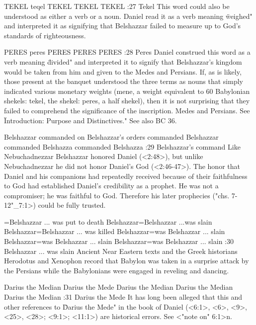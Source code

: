     {TEKEL} %
    {teqel} %
    {TEKEL} %
    {TEKEL} %
    {TEKEL} %
:27 {Tekel} %
This word could also be understood as either a verb or a noun. Daniel
read it as a verb meaning  
 \"weighed" and interpreted it as signifying that Belshazzar failed to 
measure up to God's standards of righteousness.

    {PERES} %
    {peres} %
    {PERES} %
    {PERES} %
    {PERES} %
:28 {Peres} %
Daniel construed this word as a 
verb meaning \"divided" and interpreted it to signify that Belshazzar's kingdom would be taken from
him and given to the Medes  
and Persians. If, as is likely, those present at the banquet understood the three terms as nouns
that simply indicated various monetary weights (mene, a weight equivalent to 60 Babylonian shekels: 
tekel, the shekel: peres, a half shekel), then it is not surprising that 
they failed to comprehend the significance of the inscription. 
Medes and Persians. See \"Introduction: Purpose and Distinctives." See also BC 36.

    {Belshazzar commanded} %
    {on Belshazzar's orders} %
    {commanded Belshazzar} %
    {commanded Belshazza} %
    {commanded Belshazza} %
:29 {Belshazzar's command} Like Nebuchadnezzar Belshazzar 
honored Daniel (<2:48>), but unlike Nebuchadnezzar he did not honor Daniel's God (<2:46-47>). The honor
that Daniel and his companions had repeatedly received because of their faithfulness to God 
had established Daniel's credibility as a prophet. He was not a 
compromiser; he was faithful to God. Therefore his later prophecies ("chs. 7-12"_7:1>) could be fully
trusted. 

={Belshazzar ... was put to death}  %
    {Belshazzar}={Belshazzar ...was slain}  %
    {Belshazzar}={Belshazzar ... was killed}  %
    {Belshazzar}={was Belshazzar ... slain}  %
    {Belshazzar}={was Belshazzar ... slain}  %
    {Belshazzar}={was Belshazzar ... slain}  %
:30 {Belshazzar ... was slain} Ancient Near Eastern texts and 
the Greek historians Herodotus and Xenophon record that Babylon was taken in a surprise attack by
the Persians while the Babylonians were engaged in reveling and dancing.

    {Darius the Median} %
    {Darius the Mede} %
    {Darius the Median} %
    {Darius the Median} %
    {Darius the Median} %
:31 {Darius the Mede} It has long been alleged that this and other references to \"Darius the Mede"
in the book of Daniel (<6:1>, <6>,  <9>, <25>, <28>; <9:1>; <11:1>) are historical errors. See <"note on" 6:1>n.

